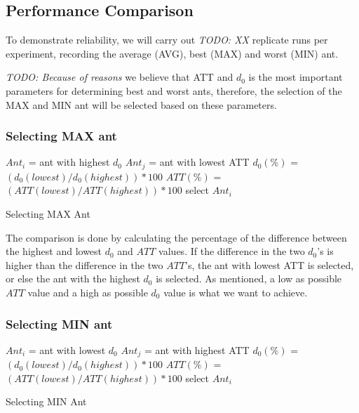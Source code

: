 \subsection{Performance Comparison}

To demonstrate reliability, we will carry out \emph{\color{blue} TODO: XX } replicate runs per experiment, recording the average (AVG), best (MAX) and worst (MIN) ant.  

\emph{\color{blue} TODO: Because of reasons }we believe that ATT and $d_0$ is the most important parameters for determining best and worst ants, therefore, the selection of the MAX and MIN ant will be selected based on these parameters. 

\subsubsection{Selecting MAX ant}
\begin{algorithm}[H]
$Ant_{i}$ = ant with highest $d_0$\;
$Ant_{j}$ = ant with lowest ATT\;
{
	$d_0(\%)$ = $(d_0(lowest) / d_0(highest))*100$\;
	$ATT(\%)$ = $(ATT(lowest) / ATT(highest))*100$\;
	{
		select $Ant_{i}$
	}
}
 \caption{Selecting MAX Ant}
\end{algorithm}


The comparison is done by calculating the percentage of the difference between the highest and lowest $d_0$ and $ATT$ values. If the difference in the two $d_0$'s is higher than the difference in the two $ATT$'s, the ant with lowest ATT is selected, or else the ant with the highest $d_0$ is selected. As mentioned, a low as possible $ATT$ value and a high as possible $d_0$ value is what we want to achieve.

\subsubsection{Selecting MIN ant}
\begin{algorithm}[H]
$Ant_{i}$ = ant with lowest $d_0$\;
$Ant_{j}$ = ant with highest ATT\;
{
	$d_0(\%)$ = $(d_0(lowest) / d_0(highest))*100$\;
	$ATT(\%)$ = $(ATT(lowest) / ATT(highest))*100$\;
	{
		select $Ant_{i}$
	}
}
 \caption{Selecting MIN Ant}

\end{algorithm}

